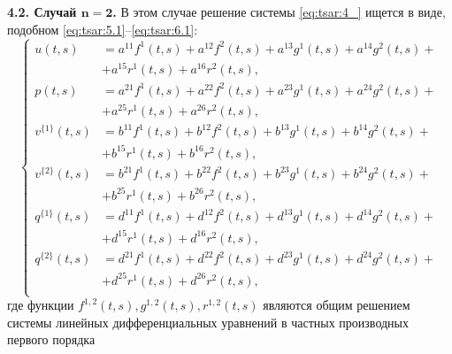 \textbf{4.2. Случай $\boldsymbol{n=2}$.} 
В этом случае решение системы \eqref{eq:tsar:4_} ищется в виде, подобном \eqref{eq:tsar:5.1}--\eqref{eq:tsar:6.1}:
\begin{equation}
\left\{
\begin{aligned}
u(t,s) &= a^{11}{f^{1}}(t,s)+a^{12}{f^{2}}(t,s)+a^{13}{g^{1}}(t,s)+a^{14}{g^{2}}(t,s)+
\\& +a^{15}{r^{1}}(t,s)+a^{16}{r^{2}}(t,s), \\
p(t,s) &= a^{21}{f^{1}}(t,s)+a^{22}{f^{2}}(t,s)+a^{23}{g^{1}}(t,s)+a^{24}{g^{2}}(t,s)+
\\& +a^{25}{r^{1}}(t,s)+a^{26}{r^{2}}(t,s),\\
v^{\{1\}}(t,s) &= b^{11}{f^{1}}(t,s)+b^{12}{f^{2}}(t,s)+b^{13}{g^{1}}(t,s)+b^{14}{g^{2}}(t,s)+
\\& +b^{15}{r^{1}}(t,s)+b^{16}{r^{2}}(t,s),\\
v^{\{2\}}(t,s) &= b^{21}{f^{1}}(t,s)+b^{22}{f^{2}}(t,s)+b^{23}{g^{1}}(t,s)+b^{24}{g^{2}}(t,s)+
\\& +b^{25}{r^{1}}(t,s)+b^{26}{r^{2}}(t,s),\\
q^{\{1\}}(t,s) &= d^{11}{f^{1}}(t,s)+d^{12}{f^{2}}(t,s)+d^{13}{g^{1}}(t,s)+d^{14}{g^{2}}(t,s)+
\\& +d^{15}{r^{1}}(t,s)+d^{16}{r^{2}}(t,s),\\
q^{\{2\}}(t,s) &= d^{21}{f^{1}}(t,s)+d^{22}{f^{2}}(t,s)+d^{23}{g^{1}}(t,s)+d^{24}{g^{2}}(t,s)+
\\& +d^{25}{r^{1}}(t,s)+d^{26}{r^{2}}(t,s),\\
\end{aligned}
\right. \label{eq:tsar:5.2}
\end{equation}
где функции ${f^{1,2}}(t,s), g^{1,2}(t,s), r^{1,2}(t,s)$ являются общим решением системы линейных дифференциальных уравнений 
в частных производных первого порядка

